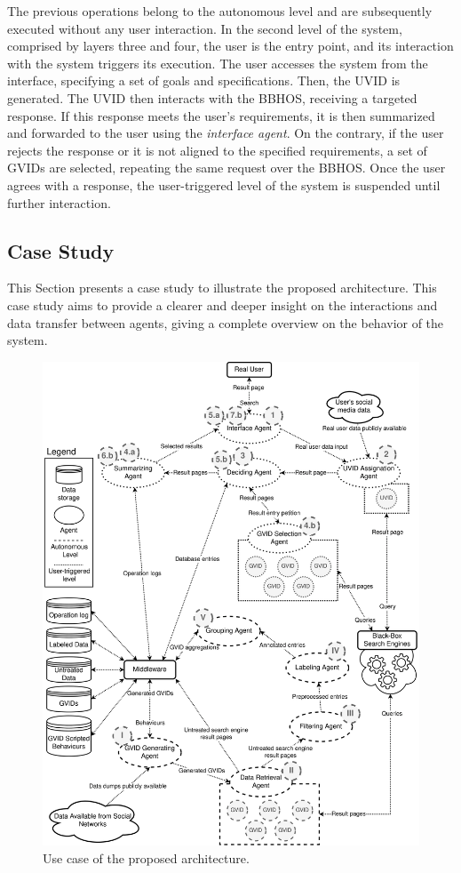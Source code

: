 The previous operations belong to the autonomous level and are subsequently executed without any user interaction. In the second level of the system, comprised by layers three and four, the user is the entry point, and its interaction with the system triggers its execution. The user accesses the system from the interface, specifying a set of goals and specifications. Then, the UVID is generated. The UVID then interacts with the BBHOS, receiving a targeted response. If this response meets the user's requirements, it is then summarized and forwarded to the user using the \textit{interface agent}. On the contrary, if the user rejects the response or it is not aligned to the specified requirements, a set of GVIDs are selected, repeating the same request over the BBHOS. Once the user agrees with a response, the user-triggered level of the system is suspended until further interaction.

\subsection{Case Study}\label{6_sec:subsec:case_study}


This Section presents a case study to illustrate the proposed architecture. This case study aims to provide a clearer and deeper insight on the interactions and data transfer between agents, giving a complete overview on the behavior of the system. 

\begin{figure}[t!]
    \centering
    \includegraphics[width=.89\linewidth]{6_kbsextractiondl/figures/Use_Case.eps}
    \caption{Use case of the proposed architecture.}
    \label{fig:mas_use_case}
\end{figure}

